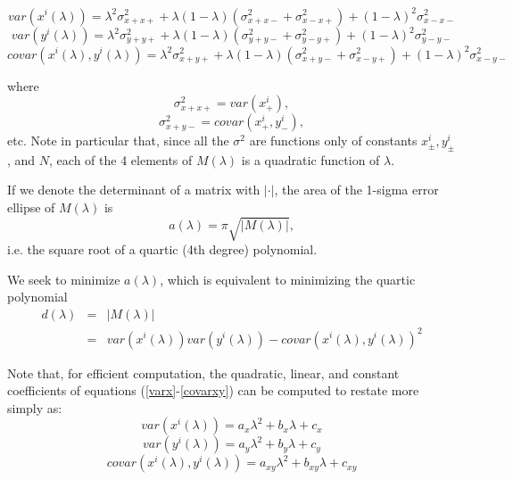 \documentclass[10pt]{amsart}
\begin{document}
\begin{equation}\label{varx}
var(x^i(\lambda)) = \lambda^2\sigma^2_{x+x+} + \lambda(1-\lambda)(\sigma^2_{x+x-} + \sigma^2_{x-x+}) 
                + (1-\lambda)^2\sigma^2_{x-x-}
\end{equation}
\begin{equation}\label{vary}
var(y^i(\lambda)) = \lambda^2\sigma^2_{y+y+} + \lambda(1-\lambda)(\sigma^2_{y+y-} + \sigma^2_{y-y+}) 
                + (1-\lambda)^2\sigma^2_{y-y-}\end{equation}
\begin{equation}\label{covarxy}
covar(x^i(\lambda),y^i(\lambda)) = \lambda^2\sigma^2_{x+y+}  
                        + \lambda(1-\lambda)(\sigma^2_{x+y-} + \sigma^2_{x-y+}) 
                              + (1-\lambda)^2\sigma^2_{x-y-}
\end{equation}

where
$$\sigma^2_{x+x+}=var(x^i_+),$$
$$\sigma^2_{x+y-}=covar(x^i_+, y^i_-),$$ 
etc. Note in particular that, since all the $\sigma^2$ are functions only of
constants $x^i_\pm, y^i_\pm$, and $N$, each of the 4 elements of $M(\lambda)$ is
a quadratic function of $\lambda$.

If we denote the determinant of a matrix with $|\cdot|$, the area of the
1-sigma error ellipse of $M(\lambda)$ is
$$a(\lambda) = \pi\sqrt{|M(\lambda)|},$$
i.e. the square root of a quartic (4th degree) polynomial.

We seek to minimize $a(\lambda)$, which is equivalent to minimizing
the quartic polynomial 
\begin{eqnarray*}
d(\lambda)&=&|M(\lambda)| \\
          &=&var(x^i(\lambda))var(y^i(\lambda)) - covar(x^i(\lambda),y^i(\lambda))^2
\end{eqnarray*}

Note that, for efficient computation, the quadratic, linear, and
constant coefficients of equations (\ref{varx}-\ref{covarxy}) can be
computed to restate more simply as:
\begin{equation}\label{qx}
var(x^i(\lambda)) = a_x\lambda^2 + b_x\lambda + c_x
\end{equation}
\begin{equation}\label{qy}
var(y^i(\lambda)) = a_y\lambda^2 + b_y\lambda + c_y
\end{equation}
\begin{equation}\label{qxy}
covar(x^i(\lambda),y^i(\lambda)) = a_{xy}\lambda^2 + b_{xy}\lambda + c_{xy}
\end{equation}
\end{document}
